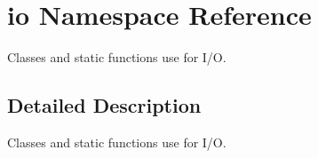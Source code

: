 \hypertarget{namespaceio}{\section{io Namespace Reference}
\label{namespaceio}
}


Classes and static functions use for I/\+O.  




\subsection{Detailed Description}
Classes and static functions use for I/\+O. 